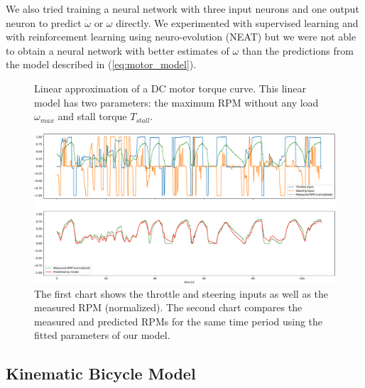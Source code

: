 We also tried training a neural network with three input neurons and one output neuron to predict $\dot{\omega}$ or $\omega$ directly. We experimented with supervised learning and with reinforcement learning using neuro-evolution (NEAT) but we were not able to obtain a neural network with better estimates of $\omega$ than the predictions from the model described in (\ref{eq:motor_model}).

\begin{figure}[b]
	\centering
	
	
	\caption{Linear approximation of a DC motor torque curve. This linear model has two parameters: the maximum RPM without any load $\omega_{max}$ and stall torque $T_{stall}$.}
	\label{fig:torque_rpm_curve}
\end{figure}

\begin{figure}[b]
	\centering
	\includegraphics[width=\textwidth]{../img/fit_8000}
	\caption{The first chart shows the throttle and steering inputs as well as the measured RPM (normalized). The second chart compares the measured and predicted RPMs for the same time period using the fitted parameters of our model.}
	\label{fig:motor_rpm_model}
\end{figure}

\subsection{Kinematic Bicycle Model}
\label{sec:kinematic-bicycle-model}


